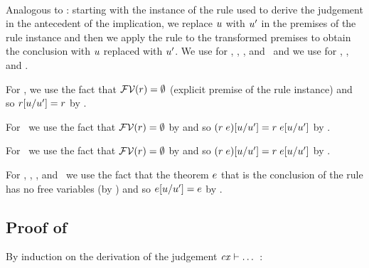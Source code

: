 \begin{bycase}
\Case{\restrules}\\
Analogous to \Rtbool: starting with the instance of the rule used to derive
the judgement in the antecedent of the implication, we replace $u$ with
$u'$ in the premises of the rule instance and then we apply the rule to
the transformed premises to obtain the conclusion with $u$ replaced with
$u'$. We use  for \Rtvar, \Rtinst, \Revar, and
\Reop\ and we use  for \Reif, \Rthifsbs, and \Rthif.

For \Rtsub, we use the fact that $\mathcal{FV}(r)=\emptyset$ (explicit premise
of the rule instance) and so $r[u/u']=r$ by
.

For \Resub\ we use the fact that $\mathcal{FV}(r)=\emptyset$ by
 and so
$(r\;e)[u/u']=r\;e[u/u']$ by
.

For \Rthsub\ we use the fact that $\mathcal{FV}(r)=\emptyset$ by
 and so
$(r\;e)[u/u']=r\;e[u/u']$ by
.

For \Rthbool, \Rthext, \Rthrec, and \Rthprojsub\ we use the fact that the
theorem $e$ that is the conclusion of the rule has no free variables (by
) and so $e[u/u']=e$ by
.

\end{bycase}



\subsection*{Proof of }

By induction on the derivation of the judgement $\mathit{cx}\vdash\ldots$\ :

